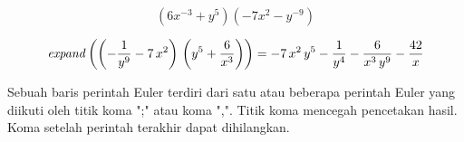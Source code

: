 \begin{eulernotebook}
\begin{eulercomment}
\end{eulercomment}
\begin{eulerformula}
\[
(6x^{-3}+y^5)(-7x^2-y^{-9})
\]
\end{eulerformula}
\begin{eulerformula}
\[
{\it expand}\left(\left(-\frac{1}{y^9}-7\,x^2\right)\,\left(y^5+  \frac{6}{x^3}\right)\right)=-7\,x^2\,y^5-\frac{1}{y^4}-\frac{6}{x^3  \,y^9}-\frac{42}{x}
\]
\end{eulerformula}
\begin{eulercomment}
\end{eulercomment}
\begin{eulercomment}
Sebuah baris perintah Euler terdiri dari satu atau beberapa perintah
Euler yang diikuti oleh titik koma ";" atau koma ",". Titik koma
mencegah pencetakan hasil. Koma setelah perintah terakhir dapat
dihilangkan.


\end{eulercomment}
\end{eulernotebook}
